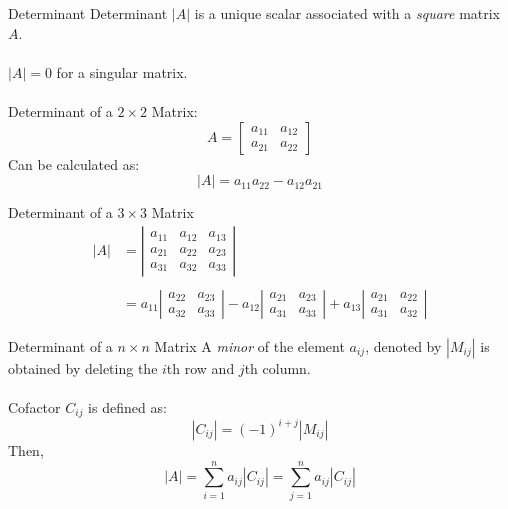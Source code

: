 \documentclass{./../../Latex/teaching_slides}
\begin{document}
\begin{frame}{Determinant}
 Determinant $|A|$ is a unique scalar associated with a \textit{square} matrix $A$. \\~\\
 $|A|=0$ for a singular matrix. \\~\\
 Determinant of a $2 \times 2$ Matrix:
 $$ A=\left[\begin{array}{ll}a_{11} & a_{12} \\ a_{21} & a_{22}\end{array}\right] $$
 Can be calculated as:
 $$ |A|=a_{11} a_{22}-a_{12} a_{21} $$  
 \end{frame}
 
\begin{frame}{Determinant of a $3 \times 3$ Matrix}
$$
\begin{aligned}
|A| &=\left|\begin{array}{lll}
a_{11} & a_{12} & a_{13} \\
a_{21} & a_{22} & a_{23} \\
a_{31} & a_{32} & a_{33}
\end{array}\right| \\~\\
&=a_{11}\left|\begin{array}{ll}
a_{22} & a_{23} \\
a_{32} & a_{33}
\end{array}\right|-a_{12}\left|\begin{array}{ll}
a_{21} & a_{23} \\
a_{31} & a_{33}
\end{array}\right| 
+a_{13}\left|\begin{array}{ll}
a_{21} & a_{22} \\
a_{31} & a_{32}
\end{array}\right|
\end{aligned}
$$
 \end{frame}
 
\begin{frame}{Determinant of a $n \times n$ Matrix}
A \textit{minor} of the element $a_{ij}$, denoted by $|M_{ij}|$ is obtained by deleting the $i$th row and $j$th column. \\~\\
Cofactor $C_{ij}$ is defined as:
$$ |C_{ij}| = (-1)^{i+j} |M_{ij}| $$
 Then, 
 $$|A| = \sum_{i=1}^n a_{ij} |C_{ij}| = \sum_{j=1}^n a_{ij} |C_{ij}| $$
 \end{frame}
 
\end{document}
